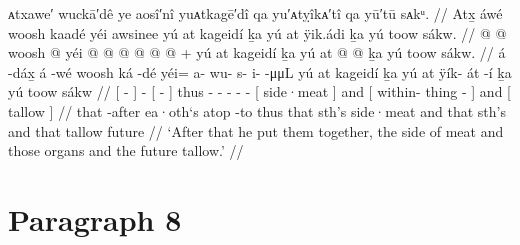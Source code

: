 \ex\label{ex:92-148-put-together-meat-organs-tallow}%
%
\begingl
	\glpreamble	ᴀtxawe′ wuckā′dê ye aosî′nî yuᴀtkagē′dî qa yu′ᴀtỵîkᴀ′tî qa yū′tū sᴀkᵘ. //
	\glpreamble	Atx̱ áwé woosh kaadé yéi awsinee yú at kageidí ḵa yú at ÿik.ádi ḵa yú toow sákw. //
	\gla	{}  @ {} {}  @ {}
		{} woosh  @ {} {}
		yéi @  @ {} @ {} @ {} @ {} @ {} +
		{} yú at kageidí {}
		ḵa {} yú at  @ {} @ {} {}
		ḵa {} yú toow sákw. {} //
	\glb	{} á -dáx̱ {} á -wé
		{} woosh ká -dé {}
		yéi= a- wu- s- i-  -μμL
		{} yú at kageidí {}
		ḵa {} yú at ÿík- át -í {}
		ḵa {} yú toow sákw {} //
	\glc	{}[  - {}]  -
		{}[   - {}]
		thus - - - -  -
		{}[   side·meat {}]
		and {}[   within- thing - {}]
		and {}[  tallow  {}] //
	\gld	{} that -after {}  {}
		{} ea·oth‘s atop -to {}
		thus  {} {} {} {} {}
		{} that sth’s side·meat {}
		and {} that sth’s  {} {} {}
		and {} that tallow future {} //
	\glft	‘After that he put them together, the side of meat and those organs and the future tallow.’
		//
\endgl
\xe


\section{Paragraph 8}\label{sec:92-para-8}


